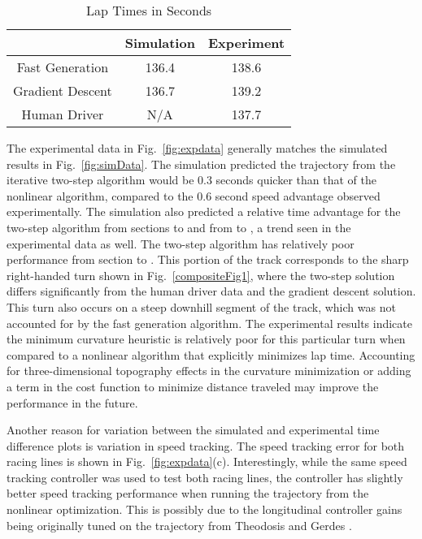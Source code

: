 \documentclass[twocolumn,10pt]{asme2ej}
\newcommand*\circled[1]{\tikz[baseline=(char.base)]{
            \node[shape=circle,draw,inner sep=2pt] (char) {#1};}}
\begin{document}
\begin{table}[h]
\begin{center}
\begin{tabular}{c|cc}
    & Simulation & Experiment \\\hline
Fast Generation& 136.4 & 138.6 \\
Gradient Descent&  136.7 & 139.2 \\
Human Driver& N/A & 137.7 \\\hline
\end{tabular}
\caption{Lap Times in Seconds}\label{tb:laptimes}
\end{center}
\end{table}
The experimental data in Fig.~\ref{fig:expdata} generally matches the simulated results in Fig.~\ref{fig:simData}. The simulation predicted the trajectory from the iterative two-step algorithm would be 0.3 seconds
 quicker than that of the nonlinear algorithm, compared to the 0.6 second speed advantage observed experimentally. 
 The simulation also predicted a relative time advantage for the two-step algorithm from sections \circled{a} to \circled{c}
 and from \circled{e} to \circled{h}, a trend seen in the experimental data as well. The two-step algorithm has relatively poor performance
 from section \circled{c} to \circled{d}. This portion of the track
corresponds to the sharp right-handed turn shown in 
Fig.~\ref{compositeFig1}, where the two-step solution differs significantly from the human driver data and the gradient descent solution. This
turn also occurs on a steep downhill segment of the track, which was not accounted for by the fast generation algorithm. The experimental results
 indicate the minimum curvature heuristic is relatively poor for this particular turn when compared to a nonlinear algorithm 
 that explicitly minimizes lap time. Accounting for three-dimensional topography effects in the curvature minimization or adding a term in the cost function to minimize
 distance traveled may improve the performance in the future.
 
 Another reason for variation between the simulated and experimental time difference plots is variation in speed tracking. 
 The speed tracking error for both racing lines is shown in Fig.~\ref{fig:expdata}(c). Interestingly, while the same speed tracking controller was used to test both racing lines, 
 the controller has slightly better speed tracking performance when running the trajectory from the nonlinear optimization. This is possibly due to the
 longitudinal controller gains being originally tuned on the trajectory from Theodosis and Gerdes \cite{theodosis}. 
\end{document}
